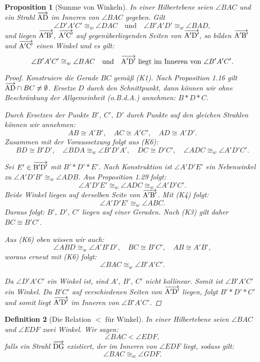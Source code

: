 \documentclass[a4paper,12pt]{article}
\theoremstyle{break}
\newtheorem{definition}{Definition}[section]
\newtheorem{proposition}[definition]{Proposition}
\begin{document}
\begin{proposition}[Summe von Winkeln]
In einer Hilbertebene seien $\angle BAC$ und ein Strahl $\overrightarrow{\rm AD}$ im Inneren von $\angle BAC$ gegeben. Gilt 
\[
\angle D'A'C' \cong_w \angle DAC \quad \text{und} \quad \angle B'A'D' \cong_w \angle BAD,
\]
und liegen $\overrightarrow{\rm A'B'}$, $\overrightarrow{\rm A'C'}$ auf gegenüberliegenden Seiten von $\overrightarrow{\rm A'D'}$, so bilden $\overrightarrow{\rm A'B'}$ und $\overrightarrow{\rm A'C'}$ einen Winkel und es gilt:
\[
\angle B'A'C' \cong_w \angle BAC \quad \text{und} \quad \overrightarrow{\rm A'D'} \text{ liegt im Inneren von } \angle B'A'C'.
\]
\begin{proof}
Konstruiere die Gerade $BC$ gemäß (K1). Nach Proposition 1.16 gilt $\overrightarrow{\rm AD} \cap BC \neq \emptyset$. Ersetze $D$ durch den Schnittpunkt, dann können wir ohne Beschränkung der Allgemeinheit (o.B.d.A.) annehmen: $B * D * C$. 

Durch Ersetzen der Punkte $B'$, $C'$, $D'$ durch Punkte auf den gleichen Strahlen können wir annehmen:
\[
AB \cong A'B', \quad AC \cong A'C', \quad AD \cong A'D'.
\]
Zusammen mit der Voraussetzung folgt aus (K6):
\[
BD \cong B'D', \quad \angle BDA \cong_w \angle B'D'A', \quad DC \cong D'C', \quad \angle ADC \cong_w \angle A'D'C'.
\]

Sei $E' \in \overrightarrow{\rm B'D'}$ mit $B' * D' * E'$. Nach Konstruktion ist $\angle A'D'E'$ ein Nebenwinkel zu $\angle A'D'B' \cong_w \angle ADB$. Aus Proposition 1.29 folgt:
\[
\angle A'D'E' \cong_w \angle ADC \cong_w \angle A'D'C'.
\]
Beide Winkel liegen auf derselben Seite von $\overrightarrow{\rm A'B'}$. Mit (K4) folgt:
\[
\angle A'D'E' \cong_w \angle ABC.
\]
Daraus folgt: $B'$, $D'$, $C'$ liegen auf einer Geraden. Nach (K3) gilt daher $BC \cong B'C'$. 

Aus (K6) oben wissen wir auch:
\[
\angle ABD \cong_w \angle A'B'D', \quad BC \cong B'C', \quad AB \cong A'B',
\]
woraus erneut mit (K6) folgt:
\[
\angle BAC \cong_w \angle B'A'C'.
\]

Da $\angle D'A'C'$ ein Winkel ist, sind $A'$, $B'$, $C'$ nicht kollinear. Somit ist $\angle B'A'C'$ ein Winkel. Da $B'C'$ auf verschiedenen Seiten von $\overrightarrow{\rm A'D'}$ liegen, folgt $B' * D' * C'$ und somit liegt $\overrightarrow{\rm A'D'}$ im Inneren von $\angle B'A'C'$.
\end{proof}
\end{proposition}

\begin{definition}[Die Relation \(<\) für Winkel]
In einer Hilbertebene seien \(\angle BAC\) und \(\angle EDF\) zwei Winkel. Wir sagen:
\[
\angle BAC < \angle EDF,
\]
falls ein Strahl \(\overrightarrow{\rm DG}\) existiert, der im Inneren von \(\angle EDF\) liegt, sodass gilt:
\[
\angle BAC \cong_w \angle GDF.
\]
\end{definition}
\end{document}
